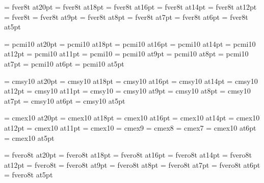 
\font\twentyrm=     fver8t at20pt
\font\eighteenrm=   fver8t at18pt
\font\sixteenrm=    fver8t at16pt
\font\fourteenrm=   fver8t at14pt
\font\twelverm=     fver8t at12pt
\font\tenrm=        fver8t
\font\ninerm=       fver8t at9pt
\font\eightrm=      fver8t at8pt
\font\sevenrm=      fver8t at7pt
\font\sixrm=        fver8t at6pt
\font\fiverm=       fver8t at5pt


\font\twentyi=      pcmi10 at20pt
\font\eighteeni=    pcmi10 at18pt
\font\sixteeni=     pcmi10 at16pt
\font\fourteeni=    pcmi10 at14pt
\font\twelvei=      pcmi10 at12pt
\font\eleveni=      pcmi10 at11pt
\font\teni=         pcmi10 %
\font\ninei=        pcmi10 at9pt
\font\eighti=       pcmi10 at8pt
\font\seveni=       pcmi10 at7pt %
\font\sixi=         pcmi10 at6pt
\font\fivei=        pcmi10 at5pt %

\font\twentysy=     cmsy10 at20pt
\font\eighteensy=   cmsy10 at18pt
\font\sixteensy=    cmsy10 at16pt
\font\fourteensy=   cmsy10 at14pt
\font\twelvesy=     cmsy10 at12pt
\font\elevensy=     cmsy10 at11pt
\font\tensy=        cmsy10 %
\font\ninesy=       cmsy10 at9pt
\font\eightsy=      cmsy10 at8pt
\font\sevensy=      cmsy10 at7pt %
\font\sixsy=        cmsy10 at6pt
\font\fivesy=       cmsy10 at5pt %

\font\twentyex=     cmex10 at20pt
\font\eighteenex=   cmex10 at18pt
\font\sixteenex=    cmex10 at16pt
\font\fourteenex=   cmex10 at14pt
\font\twelveex=     cmex10 at12pt
\font\elevenex=     cmex10 at11pt
\font\tenex=        cmex10
\font\nineex=       cmex9
\font\eightex=      cmex8
\font\sevenex=      cmex7
\font\sixex=        cmex10 at6pt
\font\fiveex=       cmex10 at5pt


\font\twentyit=     fvero8t at20pt
\font\eighteenit=   fvero8t at18pt
\font\sixteenit=    fvero8t at16pt
\font\fourteenit=   fvero8t at14pt
\font\twelveit=     fvero8t at12pt
\font\tenit=        fvero8t
\font\nineit=       fvero8t at9pt
\font\eightit=      fvero8t at8pt
\font\sevenit=      fvero8t at7pt
\font\sixit=        fvero8t at6pt
\font\fiveit=       fvero8t at5pt


